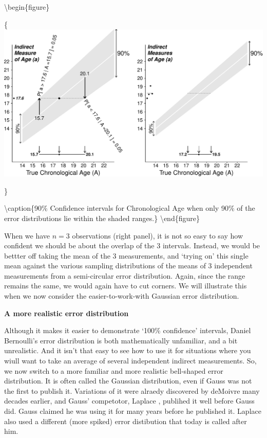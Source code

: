 \documentclass[
]{article}
\begin{document}
\textbackslash begin\{figure\}

\{\centering \includegraphics{hanley-ci_files/figure-latex/unnamed-chunk-5-1}

\}

\textbackslash caption\{90\% Confidence intervals for Chronological Age
when only 90\% of the error distributions lie within the shaded
ranges.\}\label{fig:unnamed-chunk-5} \textbackslash end\{figure\}

When we have \(n = 3\) observations (right panel), it is not so easy to
say how confident we should be about the overlap of the 3 intervals.
Instead, we would be bettter off taking the mean of the 3 measurements,
and `trying on' this single mean against the various sampling
distributions of the means of 3 independent measurements from a
semi-circular error distribution. Again, since the range remains the
same, we would again have to cut corners. We will illustrate this when
we now consider the easier-to-work-with Gaussian error distribution.

\textbf{A more realistic error distribution}

Although it makes it easier to demonstrate `100\% confidence' intervals,
Daniel Bernoulli's error distribution is both mathematically unfamiliar,
and a bit unrealistic. And it isn't that easy to see how to use it for
situations where you wiull want to take an average of several
independent indirect measurements. So, we now switch to a more familiar
and more realistic bell-shaped error distribution. It is often called
the Gaussian distribution, even if Gauss was not the first to publish
it. Variations of it were alraedy discovered by deMoivre many decades
earlier, and Gauss' competotor, Laplace , publihed it well before Gauss
did. Gauss claimed he was using it for many years before he published
it. Laplace also used a different (more spiked) error distibution that
today is called after him.
\end{document}
